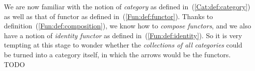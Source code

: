 We are now familiar with the notion of {\em category} as defined
in~(\ref{Cat:def:category}) as well as that of functor as defined
in~(\ref{Fun:def:functor}). Thanks to definition~(\ref{Fun:def:composition}),
we know how to {\em compose functors}, and we also have a notion of
{\em identity functor} as defined in~(\ref{Fun:def:identity}). So it is
very tempting at this stage to wonder whether the {\em collections of all
categories} could be turned into a category itself, in which the arrows
would be the functors.
TODO
\begin{defin}\label{Fun:def:category:small:cat}
\end{defin}
